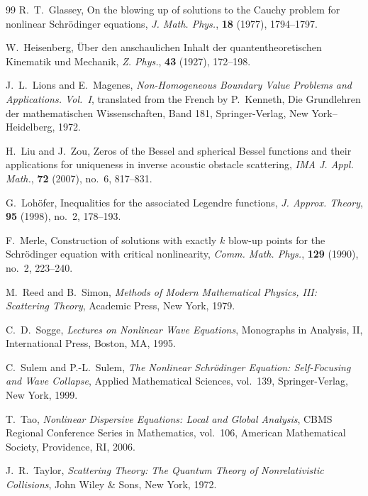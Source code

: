 \documentclass[11pt,reqno,oneside]{amsart}
\numberwithin{equation}{section}
\theoremstyle{definition}
\theoremstyle{remark}
\numberwithin{equation}{section}
\begin{document}
\begin{thebibliography}{99}
		R.~T.~Glassey,
		On the blowing up of solutions to the Cauchy problem for nonlinear Schr\"odinger equations,
		\textit{J. Math. Phys.},
		\textbf{18} (1977), 1794--1797.
		
		W.~Heisenberg,
		\"Uber den anschaulichen Inhalt der quantentheoretischen Kinematik und Mechanik,
		\textit{Z. Phys.},
		\textbf{43} (1927), 172--198.
		
		J.~L.~Lions and E.~Magenes,
		\textit{Non-Homogeneous Boundary Value Problems and Applications. Vol.~I},
		translated from the French by P.~Kenneth,
		Die Grundlehren der mathematischen Wissenschaften, Band 181,
		Springer-Verlag, New York--Heidelberg, 1972.
		
		H.~Liu and J.~Zou,
		Zeros of the Bessel and spherical Bessel functions and their applications for uniqueness in inverse acoustic obstacle scattering,
		\textit{IMA J. Appl. Math.},
		\textbf{72} (2007), no.~6, 817--831.
		
		G.~Loh\"ofer,
		Inequalities for the associated Legendre functions,
		\textit{J. Approx. Theory},
		\textbf{95} (1998), no.~2, 178--193.
		
		F.~Merle,
		Construction of solutions with exactly \(k\) blow-up points for the Schr\"odinger equation with critical nonlinearity,
		\textit{Comm. Math. Phys.},
		\textbf{129} (1990), no.~2, 223--240.
		
		M.~Reed and B.~Simon,
		\textit{Methods of Modern Mathematical Physics, III: Scattering Theory},
		Academic Press, New York, 1979.
		
		C.~D.~Sogge,
		\textit{Lectures on Nonlinear Wave Equations},
		Monographs in Analysis, II,
		International Press, Boston, MA, 1995.
		
		C.~Sulem and P.-L.~Sulem,
		\textit{The Nonlinear Schr\"odinger Equation: Self-Focusing and Wave Collapse},
		Applied Mathematical Sciences, vol.~139,
		Springer-Verlag, New York, 1999.
		
		T.~Tao,
		\textit{Nonlinear Dispersive Equations: Local and Global Analysis},
		CBMS Regional Conference Series in Mathematics, vol.~106,
		American Mathematical Society, Providence, RI, 2006.
		
		J.~R.~Taylor,
		\textit{Scattering Theory: The Quantum Theory of Nonrelativistic Collisions},
		John Wiley \& Sons, New York, 1972.
		

\end{thebibliography}
\end{document}
